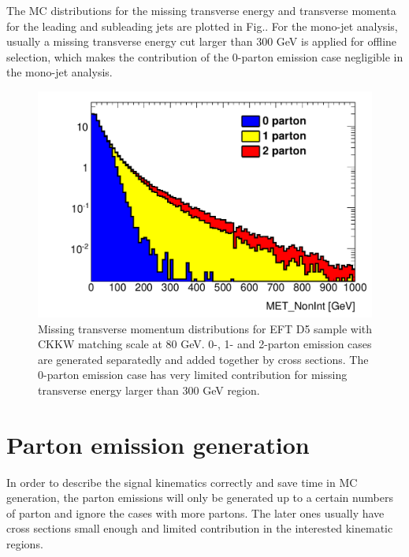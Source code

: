 The MC distributions for the missing transverse energy and transverse momenta for the leading and subleading jets are plotted in Fig.. For the mono-jet analysis, usually a missing transverse energy cut larger than 300 GeV is applied for offline selection, which makes the contribution of the 0-parton emission case negligible in the mono-jet analysis.

\begin{figure}[h!]
	\centering  
    \includegraphics[width=0.8\linewidth]{figures/monojet_appendix/MET_matching80.pdf}
	\caption{Missing transverse momentum distributions for EFT D5 sample with CKKW matching scale at 80 GeV. 0-, 1- and 2-parton emission cases are generated separatedly and added together by cross sections. The 0-parton emission case has very limited contribution for missing transverse energy larger than 300 GeV region.}
	\label{fig:Kine_D5_80}
\end{figure}


\section{Parton emission generation}
\label{sec:monojet_parton_emission}
In order to describe the signal kinematics correctly and save time in MC generation, the parton emissions will only be generated up to a certain numbers of parton and ignore the cases with more partons. The later ones usually have cross sections small enough and limited contribution in the interested kinematic regions.

